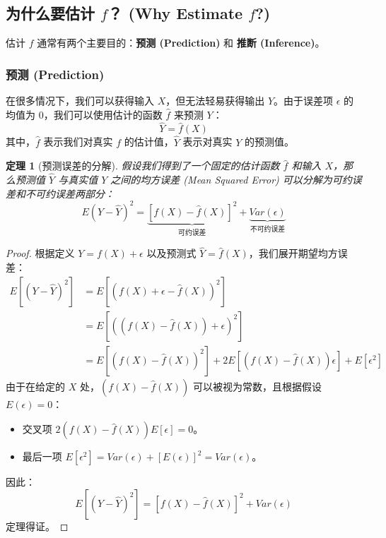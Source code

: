 \documentclass[UTF8]{ctexart}
\newtheorem{theorem}{定理}[section]
\numberwithin{equation}{section}
\begin{document}
\subsection{为什么要估计 $f$？ (Why Estimate $f$?)}

估计 $f$ 通常有两个主要目的：\textbf{预测 (Prediction)} 和 \textbf{推断 (Inference)}。

\subsubsection{预测 (Prediction)}
在很多情况下，我们可以获得输入 $X$，但无法轻易获得输出 $Y$。由于误差项 $\epsilon$ 的均值为 $0$，我们可以使用估计的函数 $\hat{f}$ 来预测 $Y$：
\begin{equation}
\hat{Y} = \hat{f}(X)
\end{equation}
其中，$\hat{f}$ 表示我们对真实 $f$ 的估计值，$\hat{Y}$ 表示对真实 $Y$ 的预测值。

\begin{theorem}[预测误差的分解]
假设我们得到了一个固定的估计函数 $\hat{f}$ 和输入 $X$，那么预测值 $\hat{Y}$ 与真实值 $Y$ 之间的均方误差 (Mean Squared Error) 可以分解为可约误差和不可约误差两部分：
\begin{equation}
E(Y - \hat{Y})^2 = \underbrace{[f(X) - \hat{f}(X)]^2}_{\text{可约误差}} + \underbrace{Var(\epsilon)}_{\text{不可约误差}}
\end{equation}
\end{theorem}

\begin{proof}
根据定义 $Y = f(X) + \epsilon$ 以及预测式 $\hat{Y} = \hat{f}(X)$，我们展开期望均方误差：
\begin{align*}
E[(Y - \hat{Y})^2] &= E[(f(X) + \epsilon - \hat{f}(X))^2] \\
&= E[((f(X) - \hat{f}(X)) + \epsilon)^2] \\
&= E[(f(X) - \hat{f}(X))^2] + 2E[(f(X) - \hat{f}(X))\epsilon] + E[\epsilon^2]
\end{align*}
由于在给定的 $X$ 处，$(f(X) - \hat{f}(X))$ 可以被视为常数，且根据假设 $E(\epsilon) = 0$：
\begin{itemize}
    \item 交叉项 $2(f(X) - \hat{f}(X))E[\epsilon] = 0$。
    \item 最后一项 $E[\epsilon^2] = Var(\epsilon) + [E(\epsilon)]^2 = Var(\epsilon)$。
\end{itemize}
因此：
\begin{equation}
E[(Y - \hat{Y})^2] = [f(X) - \hat{f}(X)]^2 + Var(\epsilon)
\end{equation}
定理得证。
\end{proof}
\end{document}
